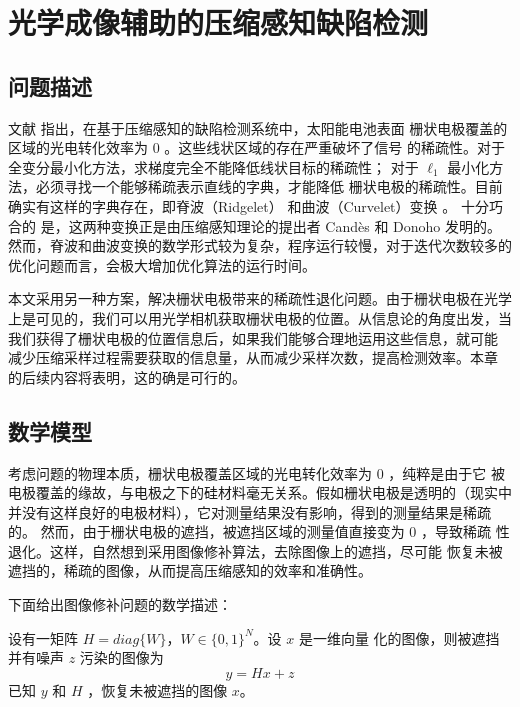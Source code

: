 \chapter{光学成像辅助的压缩感知缺陷检测}

\section{问题描述}

文献 \cite{XDUCLBIC} 指出，在基于压缩感知的缺陷检测系统中，太阳能电池表面
栅状电极覆盖的区域的光电转化效率为 $0$ 。这些线状区域的存在严重破坏了信号
的稀疏性。对于全变分最小化方法，求梯度完全不能降低线状目标的稀疏性；
对于 $\ell_1$ 最小化方法，必须寻找一个能够稀疏表示直线的字典，才能降低
栅状电极的稀疏性。目前确实有这样的字典存在，即脊波（Ridgelet）
和曲波（Curvelet）变换\cite{ridgelet, curvelet} 。 十分巧合的
是，这两种变换正是由压缩感知理论的提出者 Cand\`es 和 Donoho 发明的。
然而，脊波和曲波变换的数学形式较为复杂，程序运行较慢，对于迭代次数较多的
优化问题而言，会极大增加优化算法的运行时间。

本文采用另一种方案，解决栅状电极带来的稀疏性退化问题。由于栅状电极在光学
上是可见的，我们可以用光学相机获取栅状电极的位置。从信息论的角度出发，当
我们获得了栅状电极的位置信息后，如果我们能够合理地运用这些信息，就可能
减少压缩采样过程需要获取的信息量，从而减少采样次数，提高检测效率。本章
的后续内容将表明，这的确是可行的。

\section{数学模型}

考虑问题的物理本质，栅状电极覆盖区域的光电转化效率为 $0$ ，纯粹是由于它
被电极覆盖的缘故，与电极之下的硅材料毫无关系。假如栅状电极是透明的（现实中
并没有这样良好的电极材料），它对测量结果没有影响，得到的测量结果是稀疏的。
然而，由于栅状电极的遮挡，被遮挡区域的测量值直接变为 $0$ ，导致稀疏
性退化。这样，自然想到采用图像修补算法，去除图像上的遮挡，尽可能
恢复未被遮挡的，稀疏的图像，从而提高压缩感知的效率和准确性。

下面给出图像修补问题的数学描述：
\begin{problem}[图像修补]
设有一矩阵 $H = diag\{W\}$，$W \in \{0,1\}^{N}$。设 $x$ 是一维向量
化的图像，则被遮挡并有噪声 $z$ 污染的图像为
\begin{equation}
y = Hx + z
\end{equation}
已知 $y$ 和 $H$ ，恢复未被遮挡的图像 $x$。
\end{problem}

